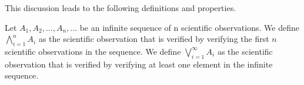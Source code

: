 \documentclass[11pt,letterpaper,fleqn]{memoir} %
\begin{document}
This discussion leads to the following definitions and properties.

\begin{defn}
	Let $A_1, A_2, ... , A_n, ...$ be an infinite sequence of n scientific observations. We define $\bigwedge\limits_{i=1}^{n} A_i$ as the scientific observation that is verified by verifying the first $n$ scientific observations in the sequence. We define $\bigvee\limits_{i=1}^{\infty} A_i$ as the scientific observation that is verified by verifying at least one element in the infinite sequence.
\end{defn}

%
%
%
%
%
\end{document}
